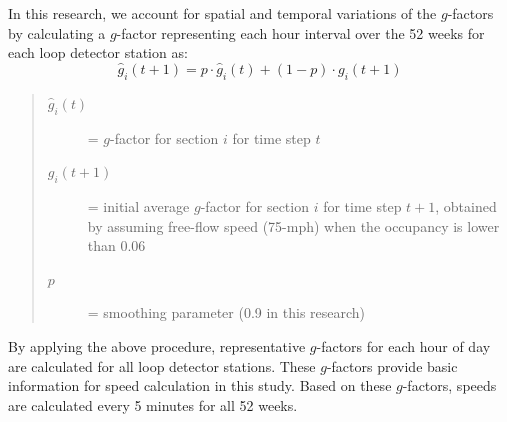 \documentclass[12pt]{report}
\newcounter{time}
\begin{document}
In this research, we account for spatial and temporal variations of
the $g$-factors by calculating a $g$-factor representing each hour
interval over the 52 weeks for each loop detector station as:
\begin{equation}
  \label{eq:g-fact}
  \hat{g}_i(t+1) = p\cdot{}\hat{g}_i(t)+(1-p)\cdot{}g_i(t+1)
\end{equation}
\begin{quote}
  \begin{description}
  \item[$\hat{g}_i(t)$] = $g$-factor for section $i$ for time step $t$
  \item[$g_i(t+1)$] = initial average $g$-factor for section $i$ for
    time step $t+1$, obtained by assuming free-flow speed (75-mph)
    when the occupancy is lower than 0.06
  \item[$p$] = smoothing parameter (0.9 in this research)
  \end{description}
\end{quote}
By applying the above procedure, representative $g$-factors for each hour of day
are calculated for all loop detector stations. These $g$-factors provide basic
information for speed calculation in this study. Based on these $g$-factors,
speeds are calculated every 5 minutes for all 52 weeks.
\end{document}

